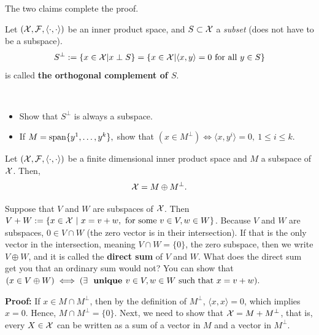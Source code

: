 The two claims complete the proof. 

\Qed

\begin{definition}
Let $({\cal X, F},  \langle \cdot,\cdot \rangle )$ be an inner product space, and $S \subset {\cal X}$ a \emph{subset} (does not have to be a subspace). 
$$S^{\perp}:= \{x \in {\cal X}|x \perp S\} = \{x \in {\cal X}|  \langle x,y \rangle =0 \textnormal{ for all }y \in S\}$$
is called \textbf{the orthogonal complement of $S$}.
\end{definition}

\begin{exercise} \mbox{ }
\begin{itemize}
    \item Show that $S^{\perp}$ is always a subspace. 
    \item If $M = \mathrm{span} \{ y^1, \ldots, y^k \},$ show that $(x \in M^\perp) \iff \langle x,y^i \rangle =0, ~ 1 \le i \le k$.
\end{itemize}


\end{exercise}

\begin{prop}
\label{prop:DirectSum}
 Let $({\cal X, F}, \langle \cdot, \cdot \rangle )$ be a finite dimensional inner product space and $M$ a subspace of $\cal X$. Then, $${\cal X} = M \oplus M^{\perp}.$$
\end{prop}

\begin{rem}
Suppose that $V$ and $W$ are subspaces of $\cal X$. Then $V+W:=\{ x\in {\cal X}~|~ x = v + w, \text{ for some } v\in V, w \in W\}$. Because $V$ and $W$ are subspaces, $0\in V \cap W$ (the zero vector is in their intersection). If that is the only vector in the intersection, meaning $V \cap W = \{0\}$, the zero subspace, then we write $V \oplus W$, and it is called the \textbf{direct sum} of $V$ and $W$. What does the direct sum get you that an ordinary sum would not? You can show that $(x \in V \oplus W) \iff (\exists ~~\text{\bf unique } v \in V, w \in W \text{ such that } x = v+w).$ 
\end{rem}

\textbf{Proof:} If $x\in M\cap M^\perp$, then by the definition of $M^\perp$, $ \langle x,x \rangle =0$, which implies $x=0$. Hence, $M \cap M^{\perp} = \{0\}$. Next, we need to show that ${\cal X} = M + M^{\perp}$, that is, every $X\in {\cal X} $ can be written as a sum of a vector in $M$ and a vector in $M^\perp$.\\


